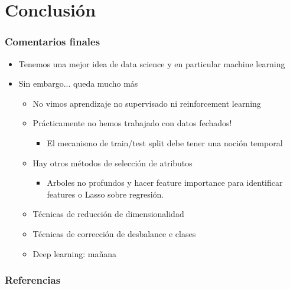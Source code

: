 \documentclass[leqno, 10pt, envcountsect]{beamer}
\numberwithin{equation}{section}
\theoremstyle{definition}
\theoremstyle{example}
\numberwithin{figure}{section}
\numberwithin{table}{section}
\let\olditem\item
\renewcommand{\item}{%
\olditem\vspace{1pt}}
\begin{document}
\section{Conclusión}
\label{sec:aprendizaje_no_supervisado}
\begin{frame}
  \frametitle{Comentarios finales}
  \begin{itemize}
    \item Tenemos una mejor idea de data science y en particular machine
      learning
    \item Sin embargo... queda mucho más
    \begin{itemize}
      \item No vimos aprendizaje no supervisado ni reinforcement learning
      \item Prácticamente no hemos trabajado con datos fechados!
        \begin{itemize}
          \item El mecanismo de train/test split debe tener una noción
            temporal
        \end{itemize}
        \item Hay otros métodos de selección de atributos
          \begin{itemize}
            \item Arboles no profundos y hacer feature importance para
              identificar features o Lasso sobre regresión.
          \end{itemize}
          \item Técnicas de reducción de dimensionalidad
          \item Técnicas de corrección de desbalance e clases
          \item Deep learning: mañana
    \end{itemize}
  \end{itemize}
\end{frame}



\begin{frame}
  \frametitle{Referencias}
  \begin{columns}
    \column{0.85\paperwidth}
    \printbibliography
  \end{columns}
\end{frame}
\end{document}
